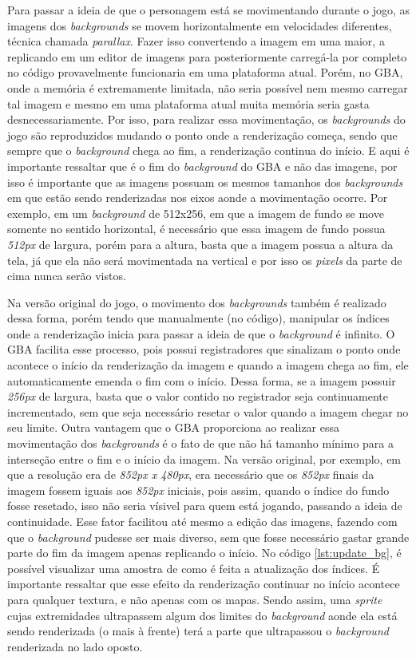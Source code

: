 Para passar a ideia de que o personagem está se movimentando durante o jogo, as imagens dos \textit{backgrounds} se movem horizontalmente em velocidades diferentes, técnica chamada \textit{parallax}. Fazer isso convertendo a imagem em uma maior, a replicando em um editor de imagens para posteriormente carregá-la por completo no código provavelmente funcionaria em uma plataforma atual. Porém, no GBA, onde a memória é extremamente limitada, não seria possível nem mesmo carregar tal imagem e mesmo em uma plataforma atual muita memória seria gasta desnecessariamente. Por isso, para realizar essa movimentação, os \textit{backgrounds} do jogo são reproduzidos mudando o ponto onde a renderização começa, sendo que sempre que o \textit{background} chega ao fim, a renderização continua do início. E aqui é importante ressaltar que é o fim do \textit{background} do GBA e não das imagens, por isso é importante que as imagens possuam os mesmos tamanhos dos \textit{backgrounds} em que estão sendo renderizadas nos eixos aonde a movimentação ocorre. Por exemplo, em um \textit{background} de 512x256, em que a imagem de fundo se move somente no sentido horizontal, é necessário que essa imagem de fundo possua \textit{512px} de largura, porém para a altura, basta que a imagem possua a altura da tela, já que ela não será movimentada na vertical e por isso os \textit{pixels} da parte de cima nunca serão vistos.

Na versão original do jogo, o movimento dos \textit{backgrounds} também é realizado dessa forma, porém tendo que manualmente (no código), manipular os índices onde a renderização inicia para passar a ideia de que o \textit{background} é infinito. O GBA facilita esse processo, pois possui registradores que sinalizam o ponto onde acontece o início da renderização da imagem e quando a imagem chega ao fim, ele automaticamente emenda o fim com o início. Dessa forma, se a imagem possuir \textit{256px} de largura, basta que o valor contido no registrador seja continuamente incrementado, sem que seja necessário resetar o valor quando a imagem chegar no seu limite. Outra vantagem que o GBA proporciona ao realizar essa movimentação dos \textit{backgrounds} é o fato de que não há tamanho mínimo para a interseção entre o fim e o início da imagem. Na versão original, por exemplo, em que a resolução era de \textit{852px x 480px}, era necessário que os \textit{852px} finais da imagem fossem iguais aos \textit{852px} iniciais, pois assim, quando o índice do fundo fosse resetado, isso não seria vísivel para quem está jogando, passando a ideia de continuidade. Esse fator facilitou até mesmo a edição das imagens, fazendo com que o \textit{background} pudesse ser mais diverso, sem que fosse necessário gastar grande parte do fim da imagem apenas replicando o início. No código \ref{lst:update_bg}, é possível visualizar uma amostra de como é feita a atualização dos índices. É importante ressaltar que esse efeito da renderização continuar no início acontece para qualquer textura, e não apenas com os mapas. Sendo assim, uma \textit{sprite} cujas extremidades ultrapassem algum dos limites do \textit{background} aonde ela está sendo renderizada (o mais à frente) terá a parte que ultrapassou o \textit{background} renderizada no lado oposto.

